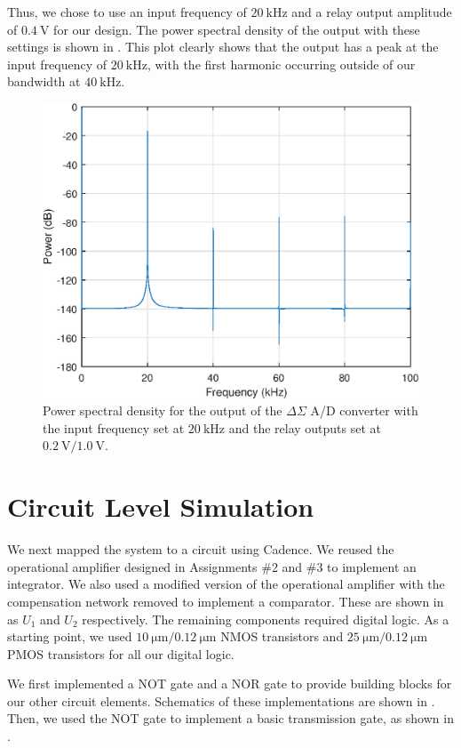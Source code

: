 \documentclass[journal,hidelinks]{IEEEtran}
\begin{document}
Thus, we chose to use an input frequency of $\SI{20}{\kilo\hertz}$ and a relay output amplitude of $\SI{0.4}{\volt}$ for our design. The power spectral density of the output with these settings is shown in . This plot clearly shows that the output has a peak at the input frequency of $\SI{20}{\kilo\hertz}$, with the first harmonic occurring outside of our bandwidth at $\SI{40}{\kilo\hertz}$.

\begin{figure}[!htb]
  \centering
  \includegraphics[width=0.8\columnwidth]{simulation/adc_sim_psd.eps}
  \caption{Power spectral density for the output of the $\Delta \Sigma$ A/D converter with the input frequency set at $\SI{20}{\kilo\hertz}$ and the relay outputs set at $\SI{0.2}{\volt}/\SI{1.0}{\volt}$.}
  \label{fig:sim_psd}
\end{figure}

\section{Circuit Level Simulation}

We next mapped the system to a circuit using Cadence. We reused the operational amplifier designed in Assignments \#2 and \#3 to implement an integrator. We also used a modified version of the operational amplifier with the compensation network removed to implement a comparator. These are shown in  as $U_1$ and $U_2$ respectively. The remaining components required digital logic. As a starting point, we used $\SI{10}{\micro\meter}/\SI{0.12}{\micro\meter}$ NMOS transistors and $\SI{25}{\micro\meter}/\SI{0.12}{\micro\meter}$ PMOS transistors for all our digital logic.

We first implemented a NOT gate and a NOR gate to provide building blocks for our other circuit elements. Schematics of these implementations are shown in . Then, we used the NOT gate to implement a basic transmission gate, as shown in .
\end{document}
